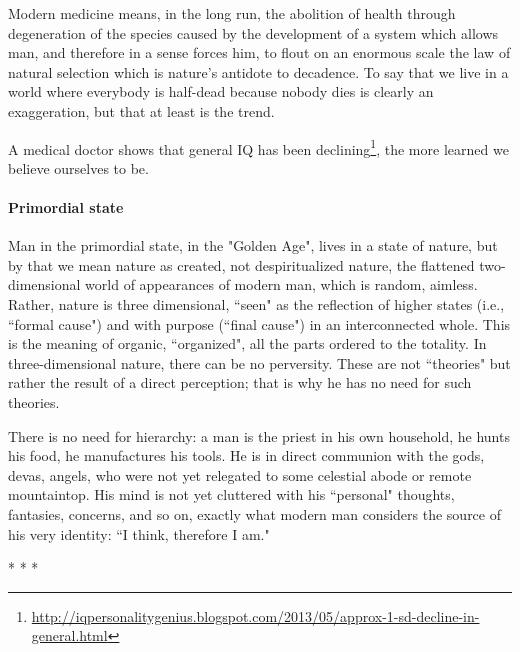 \begin{quotex}
Modern medicine means, in the long run, the abolition of health through degeneration of the species caused by the development of a system which allows man, and therefore in a sense forces him, to flout on an enormous scale the law of natural selection which is nature's antidote to decadence. To say that we live in a world where everybody is half-dead because nobody dies is clearly an exaggeration, but that at least is the trend. 

\end{quotex}
A medical doctor shows that general IQ has been declining\footnote{\url{http://iqpersonalitygenius.blogspot.com/2013/05/approx-1-sd-decline-in-general.html}}, the more learned we believe ourselves to be.

\paragraph{Primordial state}
Man in the primordial state, in the "Golden Age", lives in a state of nature, but by that we mean nature as created, not despiritualized nature, the flattened two-dimensional world of appearances of modern man, which is random, aimless. Rather, nature is three dimensional, ``seen" as the reflection of higher states (i.e., ``formal cause") and with purpose (``final cause") in an interconnected whole. This is the meaning of organic, ``organized", all the parts ordered to the totality. In three-dimensional nature, there can be no perversity. These are not ``theories" but rather the result of a direct perception; that is why he has no need for such theories.

There is no need for hierarchy: a man is the priest in his own household, he hunts his food, he manufactures his tools. He is in direct communion with the gods, devas, angels, who were not yet relegated to some celestial abode or remote mountaintop. His mind is not yet cluttered with his ``personal" thoughts, fantasies, concerns, and so on, exactly what modern man considers the source of his very identity: ``I think, therefore I am."




\begin{center}* * *\end{center}

